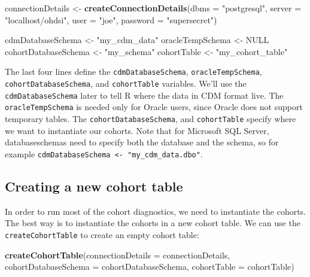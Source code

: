 \documentclass[
]{article}
\newenvironment{Shaded}{\begin{snugshade}}{\end{snugshade}}
\newcommand{\DataTypeTok}[1]{\textcolor[rgb]{0.13,0.29,0.53}{#1}}
\newcommand{\KeywordTok}[1]{\textcolor[rgb]{0.13,0.29,0.53}{\textbf{#1}}}
\newcommand{\NormalTok}[1]{#1}
\newcommand{\OtherTok}[1]{\textcolor[rgb]{0.56,0.35,0.01}{#1}}
\newcommand{\StringTok}[1]{\textcolor[rgb]{0.31,0.60,0.02}{#1}}
\begin{document}
\begin{Shaded}
\begin{Highlighting}[]
\NormalTok{connectionDetails <-}\StringTok{ }\KeywordTok{createConnectionDetails}\NormalTok{(}\DataTypeTok{dbms =} \StringTok{"postgresql"}\NormalTok{,}
                                             \DataTypeTok{server =} \StringTok{"localhost/ohdsi"}\NormalTok{,}
                                             \DataTypeTok{user =} \StringTok{"joe"}\NormalTok{,}
                                             \DataTypeTok{password =} \StringTok{"supersecret"}\NormalTok{)}

\NormalTok{cdmDatabaseSchema <-}\StringTok{ "my_cdm_data"}
\NormalTok{oracleTempSchema <-}\StringTok{ }\OtherTok{NULL}
\NormalTok{cohortDatabaseSchema <-}\StringTok{ "my_schema"}
\NormalTok{cohortTable <-}\StringTok{ "my_cohort_table"}
\end{Highlighting}
\end{Shaded}

The last four lines define the \texttt{cdmDatabaseSchema},
\texttt{oracleTempSchema}, \texttt{cohortDatabaseSchema}, and
\texttt{cohortTable} variables. We'll use the \texttt{cdmDatabaseSchema}
later to tell R where the data in CDM format live. The
\texttt{oracleTempSchema} is needed only for Oracle users, since Oracle
does not support temporary tables. The \texttt{cohortDatabaseSchema},
and \texttt{cohortTable} specify where we want to instantiate our
cohorts. Note that for Microsoft SQL Server, databaseschemas need to
specify both the database and the schema, so for example
\texttt{cdmDatabaseSchema\ \textless{}-\ "my\_cdm\_data.dbo"}.

\hypertarget{creating-a-new-cohort-table}{%
\subsection{Creating a new cohort
table}\label{creating-a-new-cohort-table}}

In order to run most of the cohort diagnostics, we need to instantiate
the cohorts. The best way is to instantiate the cohorts in a new cohort
table. We can use the \texttt{createCohortTable} to create an empty
cohort table:

\begin{Shaded}
\begin{Highlighting}[]
\KeywordTok{createCohortTable}\NormalTok{(}\DataTypeTok{connectionDetails =}\NormalTok{ connectionDetails,}
                  \DataTypeTok{cohortDatabaseSchema =}\NormalTok{ cohortDatabaseSchema,}
                  \DataTypeTok{cohortTable =}\NormalTok{ cohortTable)}
\end{Highlighting}
\end{Shaded}
\end{document}
